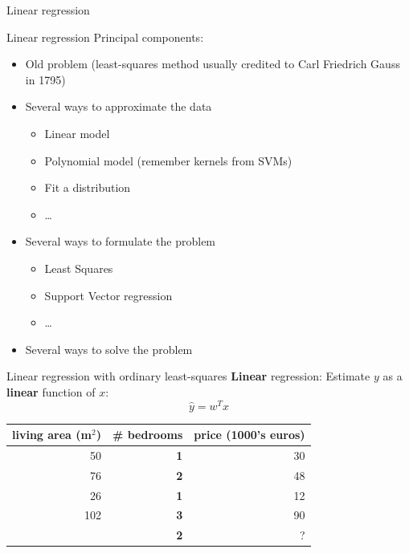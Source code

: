 \documentclass{beamer}
\begin{document}
%
\begin{frame}
\begin{center}
\Huge{Linear regression}
\end{center}
\end{frame}
%
\begin{frame}{Linear regression}
Principal components:
\begin{itemize}
	\item Old problem (least-squares method usually credited to Carl Friedrich Gauss in 1795)
	\item Several ways to approximate the data
	\begin{itemize}
		\item Linear model
		\item Polynomial model (remember kernels from SVMs)
		\item Fit a distribution
		\item \ldots
	\end{itemize}
	\item Several ways to formulate the problem
	\begin{itemize}
		\item Least Squares
		\item Support Vector regression
		\item \ldots
	\end{itemize}
	\item Several ways to solve the problem
\end{itemize}
\end{frame}

\begin{frame}{Linear regression with ordinary least-squares}
\textbf{Linear} regression: Estimate $y$ as a \textbf{linear} function of $x$:
$$ \hat{y} = w^T x$$
\end{frame}

\begin{frame}

\begin{table}
\centering
\begin{tabular}{r|r|r}
living area (m$^2$) &  \textbf{\# bedrooms} & price (1000's euros) \\\hline
50 & \textbf{1} & 30\\
76 & \textbf{2} & 48\\
26 & \textbf{1} & 12\\
102 & \textbf{3} & 90\\
\pause
61 & \textbf{2} & ?
\end{tabular}
\end{table}

\end{frame}
\end{document}

